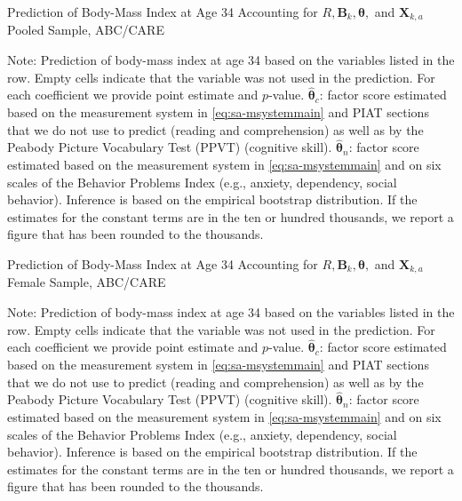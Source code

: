 \begin{table}
\begin{threeparttable}
\caption{Prediction of Body-Mass Index at Age 34 Accounting for $R, \bm{B}_k, \bm{\theta},$ and $\bm{X}_{k,a}$ Pooled Sample, ABC/CARE}
\centering
\scriptsize

\begin{tablenotes}
\footnotesize
\item Note: Prediction of body-mass index at age 34 based on the variables listed in the row. Empty cells indicate that the variable was not used in the prediction. For each coefficient we provide point estimate and $p$-value. $\hat{\bm{\theta}}_{c}$: factor score estimated based on the measurement system in \eqref{eq:sa-msystemmain} and PIAT sections that we do not use to predict (reading and comprehension) as well as by the Peabody Picture Vocabulary Test (PPVT) (cognitive skill). $\hat{\bm{\theta}}_{n}$: factor score estimated based on the measurement system in \eqref{eq:sa-msystemmain} and on six scales of the Behavior Problems Index (e.g., anxiety, dependency, social behavior). Inference is based on the empirical bootstrap distribution. If the estimates for the constant terms are in the ten or hundred thousands, we report a figure that has been rounded to the thousands.
\end{tablenotes}
\end{threeparttable}
\end{table}

\begin{table}
\begin{threeparttable}
\caption{Prediction of Body-Mass Index at Age 34 Accounting for $R, \bm{B}_k, \bm{\theta},$ and $\bm{X}_{k,a}$ Female Sample, ABC/CARE}
\centering
\scriptsize

\begin{tablenotes}
\footnotesize
\item Note: Prediction of body-mass index at age 34 based on the variables listed in the row. Empty cells indicate that the variable was not used in the prediction. For each coefficient we provide point estimate and $p$-value. $\hat{\bm{\theta}}_{c}$: factor score estimated based on the measurement system in \eqref{eq:sa-msystemmain} and PIAT sections that we do not use to predict (reading and comprehension) as well as by the Peabody Picture Vocabulary Test (PPVT) (cognitive skill). $\hat{\bm{\theta}}_{n}$: factor score estimated based on the measurement system in \eqref{eq:sa-msystemmain} and on six scales of the Behavior Problems Index (e.g., anxiety, dependency, social behavior). Inference is based on the empirical bootstrap distribution. If the estimates for the constant terms are in the ten or hundred thousands, we report a figure that has been rounded to the thousands.
\end{tablenotes}
\end{threeparttable}
\end{table}


